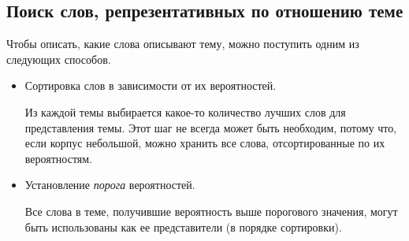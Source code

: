 \subsection{Поиск слов, репрезентативных по отношению теме}

Чтобы описать, какие слова описывают тему, можно поступить одним из следующих способов.

\begin{itemize}
\item Сортировка слов в зависимости от их вероятностей.

Из каждой темы выбирается какое-то количество лучших слов для представления темы. Этот шаг не всегда может быть необходим, потому что, если корпус небольшой, можно хранить все слова, отсортированные по их вероятностям.	

\item Установление \textit{порога} вероятностей. 

Все слова в теме, получившие вероятность выше порогового значения, могут быть использованы как ее представители (в порядке сортировки).
\end{itemize}